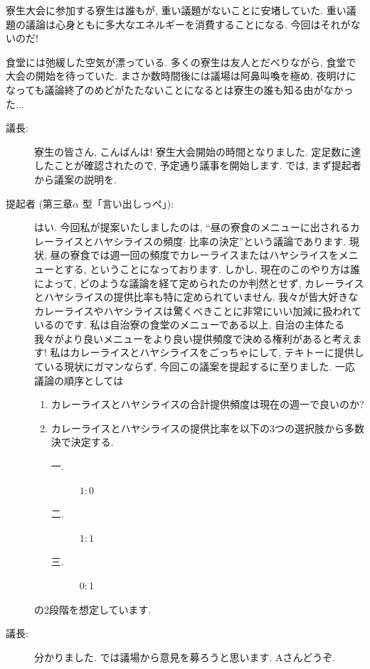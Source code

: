 \documentclass[10pt,b5jsbook,dvips,dvipdfmx,openany]{jsbook}
\theoremstyle{definition}
\begin{document}
		寮生大会に参加する寮生は誰もが, 重い議題がないことに安堵していた. 重い議題の議論は心身ともに多大なエネルギーを消費することになる. 今回はそれがないのだ!

		食堂には弛緩した空気が漂っている. 多くの寮生は友人とだべりながら, 食堂で大会の開始を待っていた. まさか数時間後には議場は阿鼻叫喚を極め, 夜明けになっても議論終了のめどがたたないことになるとは寮生の誰も知る由がなかった...

		\begin{description}

		\item[議長: ] 寮生の皆さん, こんばんは! 寮生大会開始の時間となりました. 定足数に達したことが確認されたので, 予定通り議事を開始します. では, まず提起者から議案の説明を.

		\item[提起者 (第三章$ \alpha $ 型「言い出しっぺ」): ] はい. 今回私が提案いたしましたのは, ``昼の寮食のメニューに出されるカレーライスとハヤシライスの頻度$ \cdot $ 比率の決定''という議論であります. 現状, 昼の寮食では週一回の頻度でカレーライスまたはハヤシライスをメニューとする, ということになっております. しかし, 現在のこのやり方は誰によって, どのような議論を経て定められたのか判然とせず, カレーライスとハヤシライスの提供比率も特に定められていません. 我々が皆大好きなカレーライスやハヤシライスは驚くべきことに非常にいい加減に扱われているのです. 私は自治寮の食堂のメニューである以上, 自治の主体たる我々がより良いメニューをより良い提供頻度で決める権利があると考えます! 私はカレーライスとハヤシライスをごっちゃにして, テキトーに提供している現状にガマンならず, 今回この議案を提起するに至りました. 一応議論の順序としては

		\begin{enumerate}
		\item カレーライスとハヤシライスの合計提供頻度は現在の週一で良いのか?
		\item カレーライスとハヤシライスの提供比率を以下の3つの選択肢から多数決で決定する.
			\begin{description}
			\item[一. ] $1:0$
			\item[二. ] $1:1$
			\item[三. ] $0:1$
			\end{description}
		\end{enumerate}
		の2段階を想定しています.

		\item[議長: ] 分かりました. では議場から意見を募ろうと思います. Aさんどうぞ.


\end{description}
\end{document}
